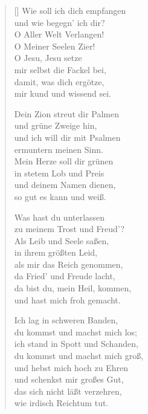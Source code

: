 
\begin{multicols}{2}
\settowidth{\versewidth}{Wie soll ich dich empfangen}                                                  
\begin{verse}[\versewidth]                                                                                              
   Wie soll ich dich empfangen\\
  und wie begegn' ich dir?\\
  O Aller Welt Verlangen!\\
  O Meiner Seelen Zier!\\
  O Jesu, Jesu setze\\
  mir selbst die Fackel bei,\\
  damit, was dich ergötze,\\
  mir kund und wissend sei.

   Dein Zion streut dir Palmen\\
  und grüne Zweige hin,\\
  und ich will dir mit Psalmen\\
  ermuntern meinen Sinn.\\
  Mein Herze soll dir grünen\\
  in stetem Lob und Preis\\
  und deinem Namen dienen,\\
  so gut es kann und weiß.
  
   Was hast du unterlassen\\
  zu meinem Trost und Freud'?\\
  Als Leib und Seele saßen,\\
  in ihrem größten Leid,\\
  als mir das Reich genommen,\\
  da Fried' und Freude lacht,\\
  da bist du, mein Heil, kommen,\\
  und hast mich froh gemacht.
  
   Ich lag in schweren Banden,\\
  du kommst und machst mich los;\\
  ich stand in Spott und Schanden,\\
  du kommst und machst mich groß,\\
  und hebst mich hoch zu Ehren\\
  und schenkst mir großes Gut,\\
  das sich nicht läßt verzehren,\\
  wie irdisch Reichtum tut.


\end{verse}
\end{multicols}
